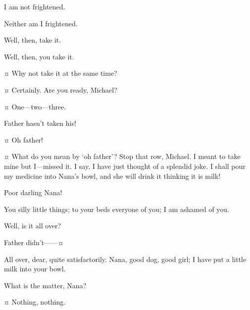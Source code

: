 \begin{drama}
\michaelspeaks
I am not frightened.

\mrdarlingspeaks
Neither am I frightened.

\michaelspeaks
Well, then, take it.

\mrdarlingspeaks
Well, then, you take it.

\wendyspeaks {}¤
Why not take it at the same time?

\mrdarlingspeaks {}¤
Certainly.
Are you ready, Michael?

\wendyspeaks {}¤
One—two—three.


\johnspeaks
Father hasn’t taken his!


\wendyspeaks {}¤
Oh father!

\mrdarlingspeaks {}¤
What do you mean by ‘oh father’?
Stop that row, Michael.
I meant to take mine but I—missed it.
I say, I have just thought of a splendid joke.
I shall pour my medicine into Nana’s bowl, and she will drink it thinking it is milk!

\wendyspeaks
Poor darling Nana!

\mrdarlingspeaks
You silly little things; to your beds everyone of you; I am ashamed of you.


\mrsdarlingspeaks
Well, is it all over?

\michaelspeaks
Father didn’t——¤

\mrdarlingspeaks
All over, dear, quite satisfactorily.
Nana, good dog, good girl; I have put a little milk into your bowl.

\mrsdarlingspeaks
What is the matter, Nana?

\mrdarlingspeaks {}¤
Nothing, nothing.


\end{drama}

